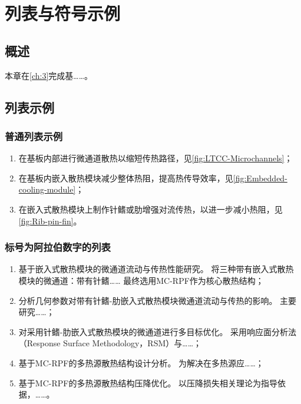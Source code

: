 
\chapter{列表与符号示例}\label{ch:4}

\section{概述}
本章在\cref{ch:3}完成基……。

\section{列表示例}\label{sec:enumerate}

\subsection{普通列表示例}
\begin{enumerate}
    \item 在基板内部进行微通道散热以缩短传热路径，见\cref{fig:LTCC-Microchannels}；
    \item 在基板内嵌入散热模块减少整体热阻，提高热传导效率，见\cref{fig:Embedded-cooling-module}；
    \item 在嵌入式散热模块上制作针鳍或肋增强对流传热，以进一步减小热阻，见\cref{fig:Rib-pin-fin}。
\end{enumerate}

\subsection{标号为阿拉伯数字的列表}

\begin{enumerate}[label =(\arabic*)]

    \item 基于嵌入式散热模块的微通道流动与传热性能研究。
          将三种带有嵌入式散热模块的微通道：带有针鳍……
          最终选用MC-RPF作为核心散热结构；
    \item 分析几何参数对带有针鳍-肋嵌入式散热模块微通道流动与传热的影响。
          主要研究……；
    \item 对采用针鳍-肋嵌入式散热模块的微通道进行多目标优化。
          采用响应面分析法（Response Surface Methodology，RSM）与……；
    \item 基于MC-RPF的多热源散热结构设计分析。
          为解决在多热源应……；
    \item 基于MC-RPF的多热源散热结构压降优化。
          以压降损失相关理论为指导依据，……。

\end{enumerate}

